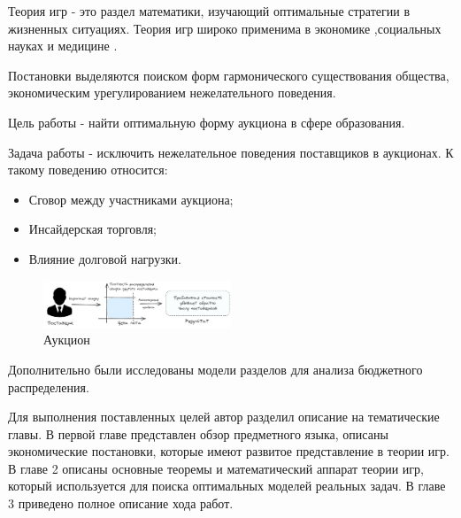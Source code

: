 Теория игр - это раздел математики, изучающий оптимальные стратегии в жизненных ситуациях. Теория игр широко применима в экономике \cite{baron1989bargaining},социальных науках \cite{arrow2012social} и медицине \cite{segev2005kidney}.


Постановки выделяются поиском форм гармонического существования общества, экономическим урегулированием нежелательного поведения.

Цель работы - найти оптимальную форму аукциона в сфере образования. 

Задача работы - исключить нежелательное поведения поставщиков в аукционах. К такому поведению относится:
\begin{itemize}
    \item Сговор между участниками аукциона;
    \item Инсайдерская торговля;
    \item Влияние долговой нагрузки.
\end{itemize}


\begin{figure}[h]
    \centering
    \includegraphics[width=0.5\textwidth]{assets/settings/auction_goal.excalidraw.png}
    \caption{Аукцион}
\end{figure}

Дополнительно были исследованы модели разделов для анализа бюджетного распределения.

Для выполнения поставленных целей автор разделил описание на тематические главы. В первой главе представлен обзор предметного языка, описаны экономические постановки, которые имеют развитое представление в теории игр.
В главе 2 описаны основные теоремы и математический аппарат теории игр, который используется для поиска оптимальных моделей реальных задач. В главе 3 приведено полное описание хода работ.

 
 



 